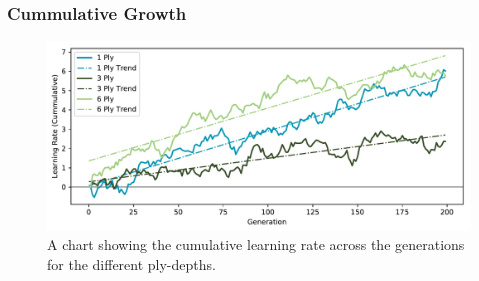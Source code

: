 \documentclass{beamer}
\begin{document}
  \begin{frame}
    \frametitle{Cummulative Growth} 
    \begin{figure}[!ht]
      
      \centering
      \includegraphics[width=250mm]{images/results/combined_cummulative.pdf}
      \caption{A chart showing the cumulative learning rate across the generations for the different ply-depths.\label{cum_growth}}
    \end{figure}
  \end{frame}
  
\end{document}
